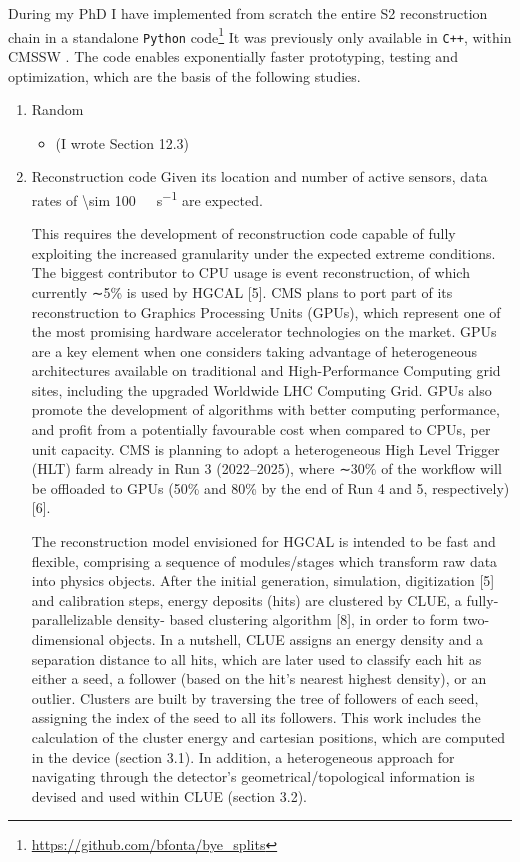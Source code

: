 \documentclass[11pt]{article}
\begin{document}
During my PhD I have implemented from scratch the entire \ac{S2} reconstruction chain in a standalone \texttt{Python} code\footnote{\url{https://github.com/bfonta/bye_splits}}
It was previously only available in \texttt{C++}, within CMSSW \cite{cmssw}.
The code enables exponentially faster prototyping, testing and optimization, which are the basis of the following studies.
\begin{enumerate}
\item Random
\label{sec:org282949a}
\begin{itemize}
\item \cite{hlttdr} (I wrote Section 12.3)
\end{itemize}
\item Reconstruction code
\label{sec:org8385797}
Given its location and number of active sensors, data rates of \SI{\sim 100}{\tera\byte\per\second} are expected.

This requires the development of reconstruction code capable of fully exploiting the increased granularity under the expected extreme conditions.
The biggest contributor to CPU usage is event reconstruction, of which currently ∼5\% is
used by HGCAL [5]. CMS plans to port part of its reconstruction to Graphics Processing
Units (GPUs), which represent one of the most promising hardware accelerator technologies on
the market. GPUs are a key element when one considers taking advantage of heterogeneous
architectures available on traditional and High-Performance Computing grid sites, including the
upgraded Worldwide LHC Computing Grid. GPUs also promote the development of algorithms
with better computing performance, and profit from a potentially favourable cost when compared
to CPUs, per unit capacity. CMS is planning to adopt a heterogeneous High Level Trigger (HLT)
farm already in Run 3 (2022–2025), where ∼30\% of the workflow will be offloaded to GPUs (50\%
and 80\% by the end of Run 4 and 5, respectively) [6]. 

The reconstruction model envisioned for \ac{HGCAL} is intended to be fast and flexible, comprising a sequence of modules/stages which transform raw data into physics objects.
After the initial generation, simulation, digitization [5]
and calibration steps, energy deposits (hits) are clustered by CLUE, a fully-parallelizable density-
based clustering algorithm [8], in order to form two-dimensional objects. In a nutshell, CLUE
assigns an energy density and a separation distance to all hits, which are later used to classify
each hit as either a seed, a follower (based on the hit’s nearest highest density), or an outlier.
Clusters are built by traversing the tree of followers of each seed, assigning the index of the
seed to all its followers. This work includes the calculation of the cluster energy and cartesian
positions, which are computed in the device (section 3.1). In addition, a heterogeneous approach
for navigating through the detector’s geometrical/topological information is devised and used
within CLUE (section 3.2).
\end{enumerate}
\end{document}
